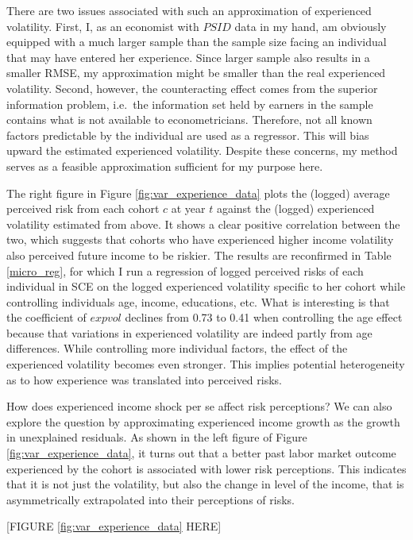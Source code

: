 There are two issues associated with such an approximation of
experienced volatility. First, I, as an economist with $PSID$ data in my
hand, am obviously equipped with a much larger sample than the sample
size facing an individual that may have entered her experience. Since
larger sample also results in a smaller RMSE, my approximation might be
smaller than the real experienced volatility. Second, however, the
counteracting effect comes from the superior information problem,
i.e.~the information set held by earners in the sample contains what is
not available to econometricians. Therefore, not all known factors
predictable by the individual are used as a regressor. This will bias
upward the estimated experienced volatility. Despite these concerns, my
method serves as a feasible approximation sufficient for my purpose
here.

The right figure in Figure \ref{fig:var_experience_data} plots the
(logged) average perceived risk from each cohort \(c\) at year \(t\)
against the (logged) experienced volatility estimated from above. It
shows a clear positive correlation between the two, which suggests that
cohorts who have experienced higher income volatility also perceived
future income to be riskier. The results are reconfirmed in Table
\ref{micro_reg}, for which I run a regression of logged perceived risks
of each individual in SCE on the logged experienced volatility specific
to her cohort while controlling individuals age, income, educations,
etc. What is interesting is that the coefficient of \(expvol\) declines
from 0.73 to 0.41 when controlling the age effect because that
variations in experienced volatility are indeed partly from age
differences. While controlling more individual factors, the effect of
the experienced volatility becomes even stronger. This implies potential
heterogeneity as to how experience was translated into perceived risks.

How does experienced income shock per se affect risk perceptions? We can
also explore the question by approximating experienced income growth as
the growth in unexplained residuals. As shown in the left figure of
Figure \ref{fig:var_experience_data}, it turns out that a better
past labor market outcome experienced by the cohort is associated with
lower risk perceptions. This indicates that it is not just the
volatility, but also the change in level of the income, that is
asymmetrically extrapolated into their perceptions of risks.

\begin{center}
[FIGURE \ref{fig:var_experience_data} HERE]
\end{center}

